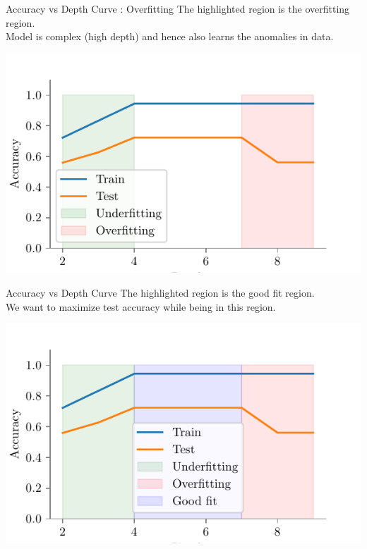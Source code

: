 \documentclass[usenames,dvipsnames]{beamer}
\begin{document}
\begin{frame}{Accuracy vs Depth Curve : Overfitting}
The highlighted region is the overfitting region.\\
Model is complex (high depth) and hence also learns the anomalies in data. 
\begin{center}
\includegraphics{../assets/bias-variance/figures/bias-variance-accuracy-vs-depth-overfitting.pdf}
\end{center}
\end{frame}

\begin{frame}{Accuracy vs Depth Curve }
The highlighted region is the good fit region.\\
We want to maximize test accuracy while being in this region.
\begin{center}
\includegraphics{../assets/bias-variance/figures/bias-variance-accuracy-vs-depth-good-fit.pdf}
\end{center}
\end{frame}
\end{document}

